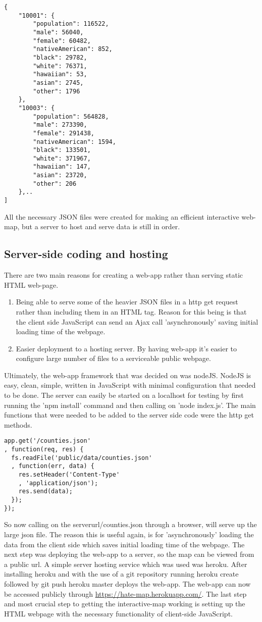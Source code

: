 \documentclass[twoside]{article}
\begin{document}
\begin{multicols}{2}
\begin{verbatim}
{
    "10001": {
        "population": 116522,
        "male": 56040,
        "female": 60482,
        "nativeAmerican": 852,
        "black": 29782,
        "white": 76371,
        "hawaiian": 53,
        "asian": 2745,
        "other": 1796
    },
    "10003": {
        "population": 564828,
        "male": 273390,
        "female": 291438,
        "nativeAmerican": 1594,
        "black": 133501,
        "white": 371967,
        "hawaiian": 147,
        "asian": 23720,
        "other": 206
    },..
]
\end{verbatim}
All the necessary JSON files were created for making an efficient interactive web-map, but a server to host and serve data is still in order. 
\subsection{Server-side coding and hosting}
There are two main reasons for creating a web-app rather than serving static HTML web-page. 

\begin{enumerate}
  \item Being able to serve some of the heavier JSON files in a http get request rather than including them in an HTML tag. Reason for this being is that the client side JavaScript can send an Ajax call 'asynchronously' saving initial loading time of the webpage. 
  \item Easier deployment to a hosting server. By having web-app it’s easier to configure large number of files to a serviceable public webpage.
\end{enumerate}
Ultimately, the web-app framework that was decided on was nodeJS.  NodeJS is easy, clean, simple, written in JavaScript with minimal configuration that needed to be done. The server can easily be started on a localhost for testing by first running the 'npm install' command and then calling on 'node index.js'. The main functions that were needed to be added to the server side code were the http get methods.

\begin{verbatim}
app.get('/counties.json'
, function(req, res) {
  fs.readFile('public/data/counties.json'
  , function(err, data) {
    res.setHeader('Content-Type'
    , 'application/json');
    res.send(data);
  });
});
\end{verbatim}
So now calling on the serverurl/counties.json through a browser, will serve up the large json file. The reason this is useful again, is for 'asynchronously' loading the data from the client side which saves initial loading time of the webpage. 
The next step was deploying the web-app to a server, so the map can be viewed from a public url. A simple server hosting service which was used was heroku. After installing heroku and with the use of a git repository running heroku create followed by git push heroku master deploys the web-app. 
The web-app can now be accessed publicly through \url{https://hate-map.herokuapp.com/}. The last step and most crucial step to getting the interactive-map 
working is setting up the HTML webpage with the necessary functionality of client-side JavaScript. 


\end{multicols}
\end{document}
